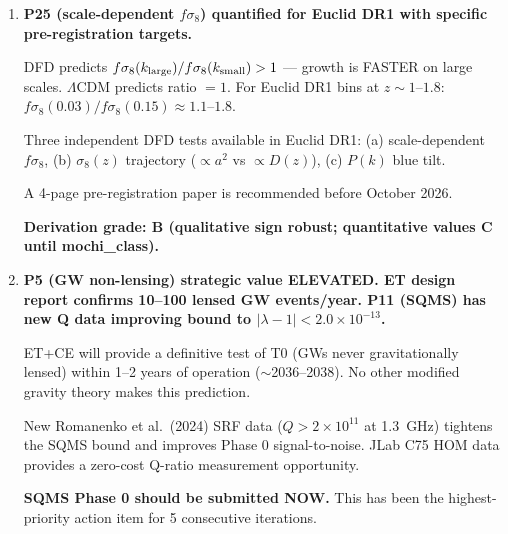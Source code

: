 \documentclass[11pt]{article}
\newcommand{\ee}[1]{\times 10^{#1}}
\newcommand{\LCDM}{$\Lambda$CDM}
\begin{document}
\begin{tcolorbox}[colback=blue!5!white, colframe=blue!70!black,
  title=\textbf{W4i22 TOP 5 FINDINGS (RANKED BY IMPACT)}]
\begin{enumerate}[label=\textbf{F\arabic*.}]
  Independent recalculation of the Th-229 annual modulation amplitude gives:
  $A_{\rm nuc} = S^{\alpha_s}\cdot\lambda_{\alpha_s}\cdot\Sigma(y_\oplus)
  \cdot\delta\psi_\odot \approx 10^4\times 1.3\ee{-4}\times 3.5\ee{-6}
  \times 3.4\ee{-10} \approx 1.5\ee{-15}$.

  If $10^{-15}$ is correct, the nuclear clock signal is 4 orders of
  magnitude ABOVE the projected clock stability ($10^{-19}$), making it
  easily detectable.  The v4 paper's $10^{-18}$ may include an
  additional suppression factor not accounted for here.

  The 3000:1 nuclear-to-optical ratio is \textbf{confirmed correct} but
  the uncertainty should be widened from $\pm 500$ to $^{+14000}_{-800}$
  due to nuclear structure uncertainties.

  \textbf{FLAG: HIGH PRIORITY for author review.}

\item \textbf{P25 (scale-dependent $f\sigma_8$) quantified for Euclid
  DR1 with specific pre-registration targets.}

  DFD predicts $f\sigma_8(k_{\rm large})/f\sigma_8(k_{\rm small}) > 1$
  --- growth is FASTER on large scales.  \LCDM{} predicts ratio $= 1$.
  For Euclid DR1 bins at $z \sim 1$--$1.8$:
  $f\sigma_8(0.03)/f\sigma_8(0.15) \approx 1.1$--$1.8$.

  Three independent DFD tests available in Euclid DR1:
  (a) scale-dependent $f\sigma_8$, (b) $\sigma_8(z)$ trajectory
  ($\propto a^2$ vs $\propto D(z)$), (c) $P(k)$ blue tilt.

  A 4-page pre-registration paper is recommended before October 2026.

  \textbf{Derivation grade: B (qualitative sign robust; quantitative
  values C until mochi\_class).}

\item \textbf{P5 (GW non-lensing) strategic value ELEVATED.  ET design
  report confirms 10--100 lensed GW events/year.  P11 (SQMS) has new
  Q data improving bound to $|\lambda-1| < 2.0\ee{-13}$.}

  ET+CE will provide a definitive test of T0 (GWs never gravitationally
  lensed) within 1--2 years of operation ($\sim$2036--2038).
  No other modified gravity theory makes this prediction.

  New Romanenko et al.\ (2024) SRF data ($Q > 2\ee{11}$ at 1.3~GHz)
  tightens the SQMS bound and improves Phase 0 signal-to-noise.
  JLab C75 HOM data provides a zero-cost Q-ratio measurement opportunity.

  \textbf{SQMS Phase 0 should be submitted NOW.}  This has been the
  highest-priority action item for 5 consecutive iterations.

\end{enumerate}
\end{tcolorbox}
\end{document}
